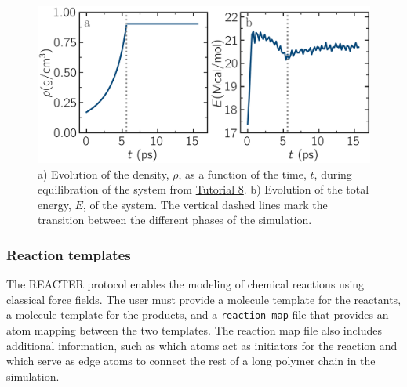 \documentclass[9pt,tutorial]{livecoms}
\newcommand{\flecmd}[1]{\textcolor{command}{\texttt{#1}}} %
\begin{document}
\begin{figure}
\centering
\includegraphics[width=\linewidth]{REACT-mixing}
\caption{a) Evolution of the density, $\rho$, as a function of the
time, $t$, during equilibration of the system from \hyperref[bond-react-label]{Tutorial 8}.
b) Evolution of the total energy, $E$, of the system.
The vertical dashed lines mark the transition between the different
phases of the simulation.}
\label{fig:evolution-density}
\end{figure}

\subsubsection{Reaction templates}

The REACTER protocol enables the modeling of chemical reactions using
classical force fields.  The user must provide a molecule template for the reactants,
a molecule template for the products, and a \flecmd{reaction map} file that
provides an atom mapping between the two templates.  The reaction map file also includes
additional information, such as which atoms act as initiators for the reaction and which
serve as edge atoms to connect the rest of a long polymer chain in the simulation.
\end{document}
